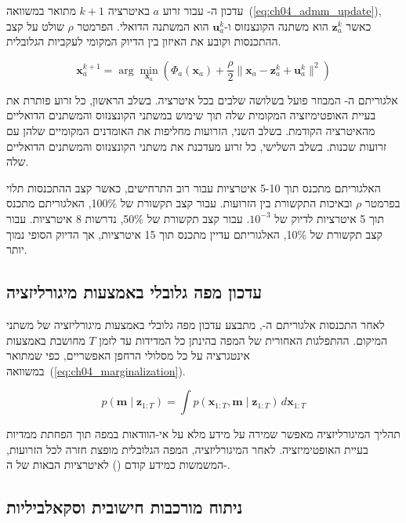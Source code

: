 עדכון ה- עבור זרוע $a$ באיטרציה $k+1$ מתואר במשוואה~(\ref{eq:ch04_admm_update}), כאשר $\mathbf{z}_a^k$ הוא משתנה הקונצנזוס ו-$\mathbf{u}_a^k$ הוא המשתנה הדואלי. הפרמטר $\rho$ שולט על קצב ההתכנסות וקובע את האיזון בין הדיוק המקומי לעקביות הגלובלית.

\begin{equation}
\mathbf{x}_a^{k+1} = \arg\min_{\mathbf{x}_a} \left( \Phi_a(\mathbf{x}_a) + \frac{\rho}{2} \|\mathbf{x}_a - \mathbf{z}_a^k + \mathbf{u}_a^k\|^2 \right)
\label{eq:ch04_admm_update}
\end{equation}

אלגוריתם ה- המבוזר פועל בשלושה שלבים בכל איטרציה. בשלב הראשון, כל זרוע פותרת את בעיית האופטימיזציה המקומית שלה תוך שימוש במשתני הקונצנזוס והמשתנים הדואליים מהאיטרציה הקודמת. בשלב השני, הזרועות מחליפות את האומדנים המקומיים שלהן עם זרועות שכנות. בשלב השלישי, כל זרוע מעדכנת את משתני הקונצנזוס והמשתנים הדואליים שלה.

האלגוריתם מתכנס תוך 5-10 איטרציות עבור רוב התרחישים, כאשר קצב ההתכנסות תלוי בפרמטר $\rho$ ובאיכות התקשורת בין הזרועות. עבור קצב תקשורת של 100\%, האלגוריתם מתכנס תוך 5 איטרציות לדיוק של $10^{-3}$. עבור קצב תקשורת של 50\%, נדרשות 8 איטרציות. עבור קצב תקשורת של 10\%, האלגוריתם עדיין מתכנס תוך 15 איטרציות, אך הדיוק הסופי נמוך יותר.

\subsection{עדכון מפה גלובלי באמצעות מיגורליזציה}
\label{sec:ch04_global_map}

לאחר התכנסות אלגוריתם ה-, מתבצע עדכון מפה גלובלי באמצעות מיגורליזציה של משתני המיקום. ההתפלגות האחורית של המפה בהינתן כל המדידות עד לזמן $T$ מחושבת באמצעות אינטגרציה על כל מסלולי הרחפן האפשריים, כפי שמתואר במשוואה~(\ref{eq:ch04_marginalization}).

\begin{equation}
p(\mathbf{m} \mid \mathbf{z}_{1:T}) = \int p(\mathbf{x}_{1:T}, \mathbf{m} \mid \mathbf{z}_{1:T}) \, d\mathbf{x}_{1:T}
\label{eq:ch04_marginalization}
\end{equation}

תהליך המיגורליזציה מאפשר שמירה על מידע מלא על אי-הוודאות במפה תוך הפחתת ממדיות בעיית האופטימיזציה. לאחר המיגורליזציה, המפה הגלובלית מופצת חזרה לכל הזרועות, המשמשות כמידע קודם () לאיטרציות הבאות של ה-.

\subsection{ניתוח מורכבות חישובית וסקאלביליות}
\label{sec:ch04_complexity}

